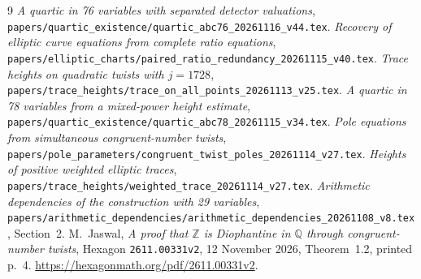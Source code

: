 \documentclass[11pt,a4paper]{article}
\newcommand{\Q}{\mathbb Q}\newcommand{\Z}{\mathbb Z}
\begin{document}
\begin{thebibliography}{9}
\emph{A quartic in 76 variables with separated detector valuations},
\nolinkurl{papers/quartic_existence/quartic_abc76_20261116_v44.tex}.
\emph{Recovery of elliptic curve equations from complete ratio equations},
\nolinkurl{papers/elliptic_charts/paired_ratio_redundancy_20261115_v40.tex}.
\emph{Trace heights on quadratic twists with $j=1728$},
\nolinkurl{papers/trace_heights/trace_on_all_points_20261113_v25.tex}.
\emph{A quartic in 78 variables from a mixed-power height estimate},
\nolinkurl{papers/quartic_existence/quartic_abc78_20261115_v34.tex}.
\emph{Pole equations from simultaneous congruent-number twists},
\nolinkurl{papers/pole_parameters/congruent_twist_poles_20261114_v27.tex}.
\emph{Heights of positive weighted elliptic traces},
\nolinkurl{papers/trace_heights/weighted_trace_20261114_v27.tex}.
\emph{Arithmetic dependencies of the construction with 29 variables},
\nolinkurl{papers/arithmetic_dependencies/arithmetic_dependencies_20261108_v8.tex},
Section~2.
 M.~Jaswal, \emph{A proof that $\Z$ is Diophantine in $\Q$
through congruent-number twists}, Hexagon \texttt{2611.00331v2},
12 November 2026, Theorem~1.2, printed p.~4.
\url{https://hexagonmath.org/pdf/2611.00331v2}.
\end{thebibliography}
\end{document}
